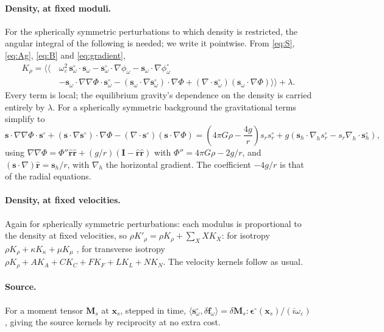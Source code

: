\documentclass[11pt,a4paper]{article}
\newcommand{\bs}{\mathbf{s}}
\newcommand{\br}{\hat{\mathbf{r}}}
\newcommand{\bx}{\mathbf{x}}
\newcommand{\bI}{\mathbf{I}}
\newcommand{\sd}{\mathbf{s}^\circ}
\newcommand{\pd}{\phi^\circ}
\theoremstyle{remark}
\begin{document}
\paragraph{Density, at fixed moduli.}
For the spherically symmetric perturbations to which density is restricted,
the angular integral of the following is needed; we write it pointwise.
From \eqref{eq:S}, \eqref{eq:Ag}, \eqref{eq:B} and \eqref{eq:gradient},
\begin{equation}
\begin{aligned}
  K_\rho = \Big\langle\!\!\Big\langle\,&\omega_\varepsilon^2\,\sd_\omega
  \cdot\bs_\omega - \sd_\omega\cdot\nabla\phi_\omega - \bs_\omega\cdot
  \nabla\pd_\omega \\
  &- \bs_\omega\cdot\nabla\nabla\Phi\cdot\sd_\omega - (\bs_\omega\cdot
  \nabla\sd_\omega)\cdot\nabla\Phi + (\nabla\cdot\sd_\omega)(\bs_\omega\cdot
  \nabla\Phi)\Big\rangle\!\!\Big\rangle + \lambda. \label{eq:Krho}
\end{aligned}
\end{equation}
Every term is local; the equilibrium gravity's dependence on the density is
carried entirely by $\lambda$. For a spherically symmetric background the
gravitational terms simplify to
\begin{equation}
  \bs\cdot\nabla\nabla\Phi\cdot\sd + (\bs\cdot\nabla\sd)\cdot\nabla\Phi
  - (\nabla\cdot\sd)(\bs\cdot\nabla\Phi)
  = \left(4\pi G\rho - \frac{4g}{r}\right)s_rs^\circ_r
  + g\left(\bs_h\cdot\nabla_hs^\circ_r - s_r\nabla_h\cdot\sd_h\right),
\end{equation}
using $\nabla\nabla\Phi = \Phi''\br\br + (g/r)(\bI-\br\br)$ with
$\Phi'' = 4\pi G\rho - 2g/r$, and $(\bs\cdot\nabla)\br = \bs_h/r$, with
$\nabla_h$ the horizontal gradient. The coefficient $-4g/r$ is that of the
radial equations.

\paragraph{Density, at fixed velocities.}
Again for spherically symmetric perturbations: each modulus is proportional
to the density at fixed velocities, so $\rho K'_\rho = \rho K_\rho +
\sum_X XK_X$: for isotropy $\rho K_\rho +
\kappa K_\kappa + \mu K_\mu$ \citep[][eq.~68]{LiuTromp2008}, for transverse
isotropy $\rho K_\rho + AK_A + CK_C + FK_F + LK_L + NK_N$. The velocity
kernels follow as usual.

\paragraph{Source.}
For a moment tensor $\mathbf{M}_s$ at $\bx_s$, stepped in time,
$\langle\sd_\omega,\delta\mathbf{f}_\omega\rangle = \delta\mathbf{M}_s:
\bm\epsilon^\circ(\bx_s)/(i\omega_\varepsilon)$, giving the source kernels
by reciprocity at no extra cost.
\end{document}
